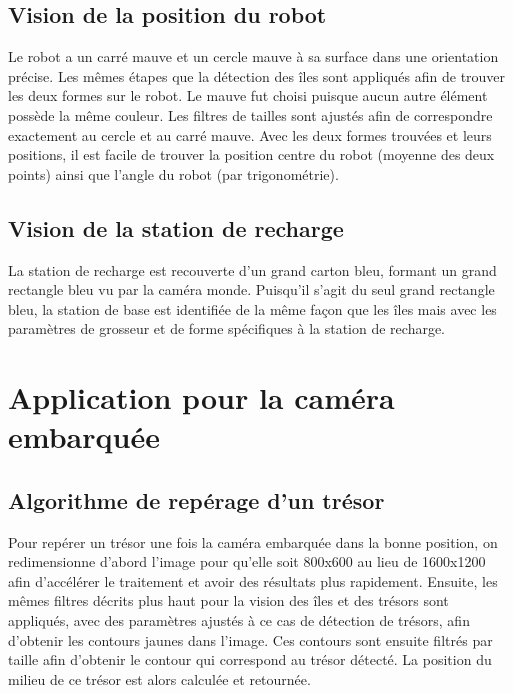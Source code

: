 \subsection{Vision de la position du robot}

Le robot a un carré mauve et un cercle mauve à sa surface dans une orientation précise. Les mêmes étapes que la détection des îles sont appliqués afin de trouver les deux formes sur le robot. Le mauve fut choisi puisque aucun autre élément possède la même couleur. Les filtres de tailles sont ajustés afin de correspondre exactement au cercle et au carré mauve. Avec les deux formes trouvées et leurs positions, il est facile de trouver la position centre du robot (moyenne des deux points) ainsi que l'angle du robot (par trigonométrie).


\subsection{Vision de la station de recharge}

La station de recharge est recouverte d'un grand carton bleu, formant un grand rectangle bleu vu par la caméra monde. Puisqu'il s'agit du seul grand rectangle bleu, la station de base est identifiée de la même façon que les îles mais avec les paramètres de grosseur et de forme spécifiques à la station de recharge.

\section{Application pour la caméra embarquée}
\subsection{Algorithme de repérage d'un trésor}
Pour repérer un trésor une fois la caméra embarquée dans la bonne position, on redimensionne d'abord l'image pour qu'elle soit 800x600 au lieu de 1600x1200 afin d'accélérer le traitement et avoir des résultats plus rapidement. Ensuite, les mêmes filtres décrits plus haut pour la vision des îles et des trésors sont appliqués, avec des paramètres ajustés à ce cas de détection de trésors, afin d'obtenir les contours jaunes dans l'image. Ces contours sont ensuite filtrés par taille afin d'obtenir le contour qui correspond au trésor détecté. La position du milieu de ce trésor est alors calculée et retournée.
 
